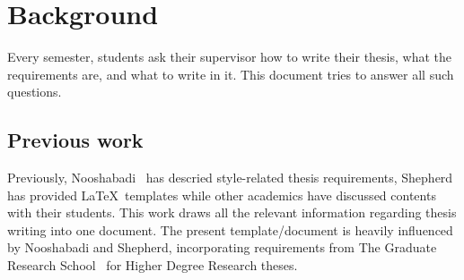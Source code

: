 \chapter{Background}\label{ch:background}

Every semester, students ask their supervisor how to write their thesis,
what the requirements are, and what to write in it.  
This document tries to answer all such questions.

\section{Previous work}

Previously, Nooshabadi~\cite{Noo05} has descried style-related thesis
requirements, Shepherd~\cite{She05} has provided \LaTeX\ templates while
other academics have discussed contents with their students.  This work
draws all the relevant information regarding thesis writing into one
document.  The present template/document is heavily influenced by
Nooshabadi and Shepherd, incorporating requirements from The Graduate
Research School~\cite{GRS14} for Higher Degree Research theses.

